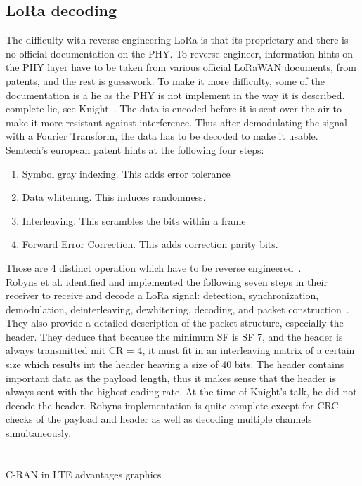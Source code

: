 \section{LoRa decoding}
The difficulty with reverse engineering LoRa is that its proprietary and
there is no official documentation on the PHY. To reverse engineer, information hints
on the PHY layer have to be taken from various official LoRaWAN documents, from patents, and the 
rest is guesswork. To make it more difficulty, some of the documentation is a lie as the PHY is not implement 
in the way it is described. 
complete lie, see Knight~\cite{knight_youtube}. 
The data is encoded before it is sent over the air to make it more resistant against interference.
Thus after demodulating the signal with a Fourier Transform, the data has to be decoded to make it usable.
Semtech's european patent hints at the following four steps:
\begin{enumerate}
    \item Symbol gray indexing. This adds error tolerance
    \item Data whitening. This induces randomness.
    \item Interleaving. This scrambles the bits within a frame
    \item Forward Error Correction. This adds correction parity bits.
    
\end{enumerate}
Those are 4 distinct operation which have to be reverse engineered~\cite{knight_youtube}.\\
Robyns et al. identified and implemented the following seven steps in their receiver to 
receive and decode a LoRa signal: detection, synchronization, demodulation, deinterleaving, dewhitening,
decoding, and packet construction~\cite{robyns_implementation}. They also provide a detailed description of the 
packet structure, especially the header. They deduce that because the minimum SF is SF 7, and the header is always 
transmitted mit CR = 4, it must fit in an interleaving matrix of a certain size which results int the header heaving a size of 
40 bits. The header contains important data as the payload length, thus it makes sense that the header is always sent with the highest
coding rate.
At the time of Knight's talk, he did not decode the header. Robyns implementation is quite complete except for CRC checks of the payload and header
as well as decoding multiple channels simultaneously. 


\chapter{}{C-RAN in LTE}
advantages
graphics
